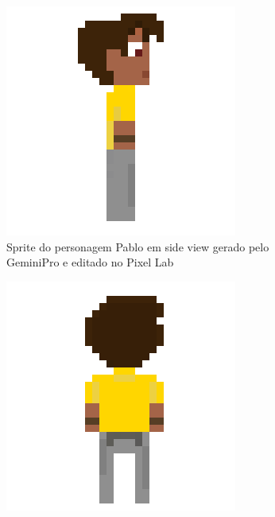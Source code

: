 \begin{figure}[htbp]
\begin{subfigure}{0.22\linewidth}
        \includegraphics[width=1\linewidth]{figs/sprites/Pablo_sideView.png}
        \caption{\small Sprite do personagem Pablo em side view gerado pelo GeminiPro e editado no Pixel Lab}
        \label{fig:viduPabloGeminiProSide}
    \end{subfigure}
    \begin{subfigure}{0.22\linewidth}
        \centering
        \includegraphics[width=1\linewidth]{figs/sprites/Pablo_backView.png}

\end{subfigure}
\end{figure}
